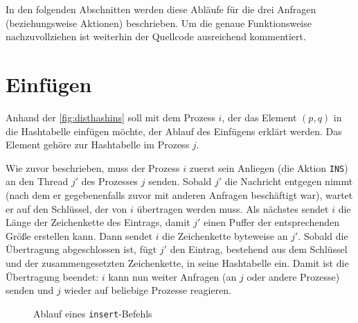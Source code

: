 \documentclass{scrreprt}
\begin{document}
In den folgenden Abschnitten werden diese Abläufe für die drei Anfragen (beziehungsweise Aktionen) beschrieben. Um die genaue Funktionsweise nachzuvollziehen ist weiterhin der Quellcode ausreichend kommentiert.

\section{Einfügen}

Anhand der \autoref{fig:disthashins} soll mit dem Prozess $i$, der das Element $(p,q)$ in die Hashtabelle einfügen möchte, der Ablauf des Einfügens erklärt werden. Das Element gehöre zur Hashtabelle im Prozess $j$.

Wie zuvor beschrieben, muss der Prozess $i$ zuerst sein Anliegen (die Aktion \lstinline`INS`) an den Thread $j'$ des Prozesses $j$ senden. Sobald $j'$ die Nachricht entgegen nimmt (nach dem er gegebenenfalls zuvor mit anderen Anfragen beschäftigt war), wartet er auf den Schlüssel, der von $i$ übertragen werden muss. Als nächstes sendet $i$ die Länge der Zeichenkette des Eintrags, damit $j'$ einen Puffer der entsprechenden Größe erstellen kann. Dann sendet $i$ die Zeichenkette byteweise an $j'$. Sobald die Übertragung abgeschlossen ist, fügt $j'$ den Eintrag, bestehend aus dem Schlüssel und der zusammengesetzten Zeichenkette, in seine Hashtabelle ein. Damit ist die Übertragung beendet: $i$ kann nun weiter Anfragen (an $j$ oder andere Prozesse) senden und $j$ wieder auf beliebige Prozesse reagieren.
\begin{figure}[!ht]
\centering
{}
\caption{Ablauf eines \lstinline`insert`-Befehls}
\label{fig:disthashins}
\end{figure}
\end{document}
